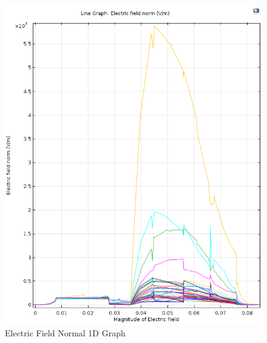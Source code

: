 \documentclass[]{article}
\begin{document}
\\
\\
\\
\\
\\
\\
\begin{figure}[h!]
	\centering
	\includegraphics[width=10.5 cm, height=10.5 cm]{OneDElectricFieldNormalGraphImage.png}
	\caption{Electric Field Normal 1D Graph}
	\label{fig:mesh6}
\end{figure}
\\
\\
\\
\end{document}
